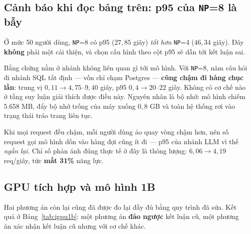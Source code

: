 \documentclass[12pt,a4paper]{article}
\begin{document}
\subsection{Cảnh báo khi đọc bảng trên: p95 của \texttt{NP}=8 là bẫy}

Ở mức 50 người dùng, \texttt{NP}=8 có p95 ($27{,}85$ giây) \emph{tốt hơn}
\texttt{NP}=4 ($46{,}34$ giây). Đây \textbf{không} phải một cải thiện, và chọn cấu
hình theo cột p95 sẽ dẫn tới kết luận sai.

Bằng chứng nằm ở nhánh không liên quan gì tới mô hình. Với \texttt{NP}=8, năm câu
hỏi đi nhánh SQL tất định --- vốn chỉ chạm Postgres --- \textbf{cũng chậm đi hàng
chục lần}: trung vị $0{,}11 \to 4{,}75$--$9{,}40$ giây, p95 $0{,}4 \to 20$--$22$
giây. Không có cơ chế nào ở tầng suy luận giải thích được điều này. Nguyên nhân là
bộ nhớ: mô hình chiếm 5.658 MB, đẩy bộ nhớ trống của máy xuống $0{,}8$ GB và toàn
hệ thống rơi vào trạng thái tráo trang liên tục.

Khi mọi request đều chậm, mỗi người dùng ảo quay vòng chậm hơn, nên số request
gọi mô hình dồn vào hàng đợi cũng ít đi --- p95 của nhánh LLM vì thế \emph{ngắn
lại}. Chỉ số phản ánh đúng thực tế ở đây là thông lượng: $6{,}06 \to 4{,}19$
req/giây, tức \textbf{mất 31\%} năng lực.

\subsection{GPU tích hợp và mô hình 1B}
\label{sec:igpu1b}

Hai phương án còn lại cũng đã được đo lại đầy đủ bằng quy trình đã sửa. Kết quả
ở Bảng~\ref{tab:igpu1b}: một phương án \textbf{đảo ngược} kết luận cũ, một phương
án xác nhận kết luận cũ nhưng với cơ chế khác.
\end{document}
